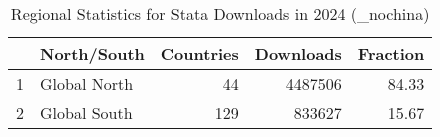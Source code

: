 \begin{table}[ht]
\centering
\begin{tabular}{rlrrr}
  \hline
 & North/South & Countries & Downloads & Fraction \\ 
  \hline
1 & Global North &  44 & 4487506 & 84.33 \\ 
  2 & Global South & 129 & 833627 & 15.67 \\ 
   \hline
\end{tabular}
\caption{Regional Statistics for Stata Downloads in 2024 (_nochina)} 
\label{tab:stata_downloads_global_stats_2024_nochina}
\end{table}
